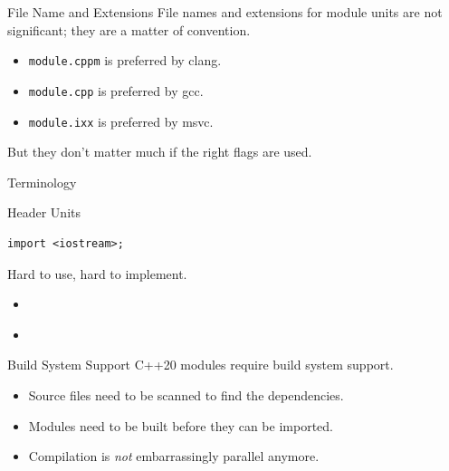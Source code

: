 \documentclass[aspectratio=169]{beamer}
\begin{document}
\begin{frame}{File Name and Extensions}
  File names and extensions for module units are not significant; they are a matter of convention.

  \begin{itemize}
    \item \texttt{module.cppm} is preferred by clang.
    \item \texttt{module.cpp} is preferred by gcc.
    \item \texttt{module.ixx} is preferred by msvc.
  \end{itemize}

  But they don't matter much if the right flags are used.
\end{frame}

\begin{frame}[fragile]{Terminology}
  \begin{block}{Header Units}
    \begin{verbatim}
import <iostream>;
    \end{verbatim}
    \vspace{1em}
    Hard to use, hard to implement.
    \begin{itemize}
      \item \cite{Engert23}
      \item \cite{Ruoso23}
    \end{itemize}
  \end{block}
\end{frame}

\begin{frame}{Build System Support}
  C++20 modules require build system support.
  \begin{itemize}
    \item Source files need to be scanned to find the dependencies.
    \item Modules need to be built before they can be imported.
    \item Compilation is \emph{not} embarrassingly parallel anymore.
  \end{itemize}
\end{frame}
\end{document}
